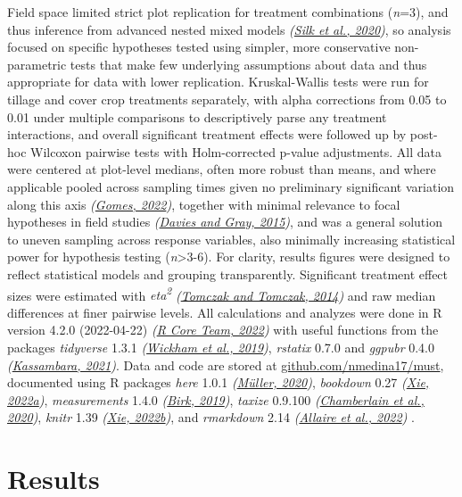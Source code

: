 \documentclass[
  12pt,
]{article}
\begin{document}
Field space limited strict plot replication for treatment combinations (\emph{n}=3), and thus inference from advanced nested mixed models \emph{(\protect\hyperlink{ref-silk20}{Silk et al., 2020})}, so analysis focused on specific hypotheses tested using simpler, more conservative non-parametric tests that make few underlying assumptions about data and thus appropriate for data with lower replication.
Kruskal-Wallis tests were run for tillage and cover crop treatments separately, with alpha corrections from 0.05 to 0.01 under multiple comparisons to descriptively parse any treatment interactions, and overall significant treatment effects were followed up by post-hoc Wilcoxon pairwise tests with Holm-corrected p-value adjustments.
All data were centered at plot-level medians, often more robust than means, and where applicable pooled across sampling times given no preliminary significant variation along this axis \emph{(\protect\hyperlink{ref-gomes22}{Gomes, 2022})}, together with minimal relevance to focal hypotheses in field studies \emph{(\protect\hyperlink{ref-davies15b}{Davies and Gray, 2015})}, and was a general solution to uneven sampling across response variables, also minimally increasing statistical power for hypothesis testing (\emph{n}\textgreater3-6).
For clarity, results figures were designed to reflect statistical models and grouping transparently.
Significant treatment effect sizes were estimated with \emph{eta\textsuperscript{2}} \emph{(\protect\hyperlink{ref-tomczak14}{Tomczak and Tomczak, 2014})} and raw median differences at finer pairwise levels.
All calculations and analyzes were done in R version 4.2.0 (2022-04-22) \emph{(\protect\hyperlink{ref-base}{R Core Team, 2022})} with useful functions from the packages \emph{tidyverse} 1.3.1 \emph{(\protect\hyperlink{ref-tidyverse}{Wickham et al., 2019})}, \emph{rstatix} 0.7.0 and \emph{ggpubr} 0.4.0 \emph{(\protect\hyperlink{ref-rstatix}{Kassambara, 2021})}.
Data and code are stored at \url{github.com/nmedina17/must},
documented using R packages
\emph{here} 1.0.1 \emph{(\protect\hyperlink{ref-here}{Müller, 2020})},
\emph{bookdown} 0.27 \emph{(\protect\hyperlink{ref-bookdown2022}{Xie, 2022a})},
\emph{measurements} 1.4.0 \emph{(\protect\hyperlink{ref-measurements}{Birk, 2019})},
\emph{taxize} 0.9.100 \emph{(\protect\hyperlink{ref-taxize2020}{Chamberlain et al., 2020})},
\emph{knitr} 1.39 \emph{(\protect\hyperlink{ref-knitr2022}{Xie, 2022b})}, and
\emph{rmarkdown} 2.14 \emph{(\protect\hyperlink{ref-rmarkdown2022}{Allaire et al., 2022})}
.

\hypertarget{results}{%
\section{Results}\label{results}}
\end{document}
